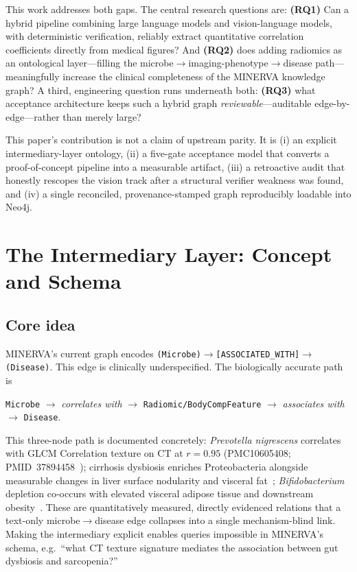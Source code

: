 \documentclass[10pt,twocolumn,letterpaper]{article}
\begin{document}
This work addresses both gaps. The central research questions are:
\textbf{(RQ1)} Can a hybrid pipeline combining large language models and
vision-language models, with deterministic verification, reliably extract
quantitative correlation coefficients directly from medical figures? And
\textbf{(RQ2)} does adding radiomics as an ontological layer---filling the
microbe$\rightarrow$imaging-phenotype$\rightarrow$disease path---meaningfully
increase the clinical completeness of the MINERVA knowledge graph? A third,
engineering question runs underneath both: \textbf{(RQ3)} what acceptance
architecture keeps such a hybrid graph \emph{reviewable}---auditable
edge-by-edge---rather than merely large?

This paper's contribution is not a claim of upstream parity. It is (i) an
explicit intermediary-layer ontology, (ii) a five-gate acceptance model that
converts a proof-of-concept pipeline into a measurable artifact, (iii) a
retroactive audit that honestly rescopes the vision track after a structural
verifier weakness was found, and (iv) a single reconciled, provenance-stamped
graph reproducibly loadable into Neo4j.

\section{The Intermediary Layer: Concept and Schema}

\subsection{Core idea}

MINERVA's current graph encodes
\texttt{(Microbe)$\rightarrow$[ASSOCIATED\_WITH]$\rightarrow$(Disease)}. This
edge is clinically underspecified. The biologically accurate path is

\begin{center}
\small
\texttt{Microbe} $\rightarrow$ \textit{correlates with} $\rightarrow$
\texttt{Radiomic/BodyComp\-Feature} $\rightarrow$ \textit{associates with}
$\rightarrow$ \texttt{Disease}.
\end{center}

This three-node path is documented concretely: \textit{Prevotella
nigrescens} correlates with GLCM Correlation texture on CT at $r=0.95$
(PMC10605408; PMID~37894458~\cite{botticelli2023qta}); cirrhosis dysbiosis
enriches Proteobacteria alongside measurable changes in liver surface
nodularity and visceral fat~\cite{tilg2022gutliver};
\textit{Bifidobacterium} depletion co-occurs with elevated visceral
adipose tissue and downstream obesity~\cite{cani2008endotoxemia}. These are quantitatively measured, directly
evidenced relations that a text-only microbe$\rightarrow$disease edge
collapses into a single mechanism-blind link. Making the intermediary
explicit enables queries impossible in MINERVA's schema, e.g.\ ``what CT
texture signature mediates the association between gut dysbiosis and
sarcopenia?''
\end{document}
